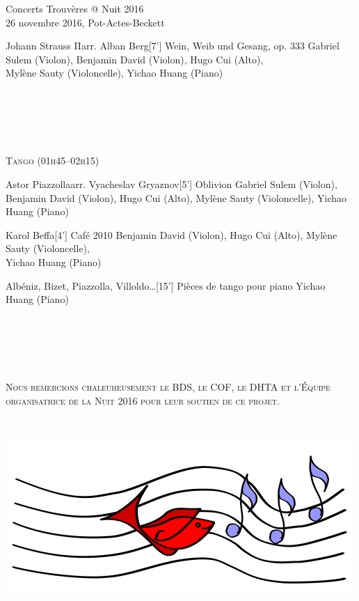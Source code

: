 \documentclass[a4paper,11pt,poets,durations]{ConcProg}
\begin{document}
{\begin{programme}{
    Concerts Trouvères @ Nuit 2016
\\  {\normalsize 26 novembre 2016, Pot-Actes-Beckett}
}
\begin{part}[]
\begin{composition}{Johann Strauss II}{arr. Alban Berg}{[7'] Wein, Weib und Gesang, op. 333}{}
      {\small Gabriel Sulem (Violon), Benjamin David (Violon), Hugo Cui (Alto),\\Mylène Sauty (Violoncelle), Yichao Huang (Piano)}
    \end{composition}\\
~\\
~\\
~\\
\begin{center}
\textsc{Tango (01h45--02h15)}
\end{center}
    \begin{composition}{Astor Piazzolla}{arr. Vyacheslav Gryaznov}{[5'] Oblivion}{}
      {\small Gabriel Sulem (Violon), Benjamin David (Violon), Hugo Cui (Alto), Mylène Sauty (Violoncelle), Yichao Huang (Piano)}
    \end{composition}
    \begin{composition}{Karol Beffa}{}{[4'] Café 2010}{}
      {\small Benjamin David (Violon), Hugo Cui (Alto), Mylène Sauty (Violoncelle),\\Yichao Huang (Piano)}
    \end{composition}
    \begin{composition}{Albéniz, Bizet, Piazzolla, Villoldo\dots}{}{[15'] Pièces de tango pour piano}{}
      {\small Yichao Huang (Piano)}
    \end{composition}\\
~\\
~\\
~\\
\begin{center}
\textsc{Nous remercions chaleuheusement le BDS, le COF, le DHTA et l'Équipe organisatrice de la Nuit 2016 pour leur soutien de ce projet.}
\end{center}
~\\
  \end{part}
\end{programme}
}
\begin{center}
\includegraphics[scale=3]{logo.png}
\end{center}
\end{document}
